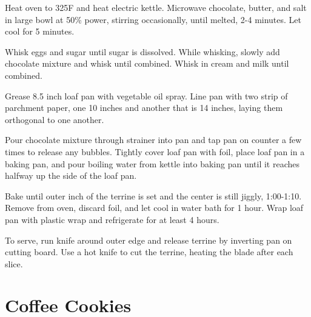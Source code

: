 \documentclass[oneside]{book}  %
\def\thisrecipe{}  %
\newcommand{\recipe}[1]{\section{#1}\def\thisrecipe{: #1}} %
\newcommand{\degF}{\textdegree F\xspace}
\begin{document}
\begin{directions}
  \item Heat oven to 325\degF and heat electric kettle. Microwave chocolate,
    butter, and salt in large bowl at 50\% power, stirring occasionally, until
    melted, 2-4 minutes. Let cool for 5 minutes.

  \item Whisk eggs and sugar until sugar is dissolved. While whisking, slowly
  add chocolate mixture and whisk until combined. Whisk in cream and milk until
  combined.

  \item Grease 8.5 inch loaf pan with vegetable oil spray. Line
  pan with two strip of parchment paper, one 10 inches and another
  that is 14 inches, laying them orthogonal to one another.

  \item Pour chocolate mixture through strainer into pan and tap pan on counter
  a few times to release any bubbles. Tightly cover loaf pan with foil, place
  loaf pan in a baking pan, and pour boiling water from kettle into baking pan
  until it reaches halfway up the side of the loaf pan.

  \item Bake until outer inch of the terrine is set and the center is still
  jiggly, 1:00-1:10. Remove from oven, discard foil, and let cool in water bath
  for 1 hour. Wrap loaf pan with plastic wrap and refrigerate for at least 4
  hours.

  \item To serve, run knife around outer edge and release terrine by inverting
  pan on cutting board. Use a hot knife to cut the terrine, heating the blade
  after each slice.
\end{directions}
\recipe{Coffee Cookies} \label{recipe:coffee_cookies} %
\end{document}
